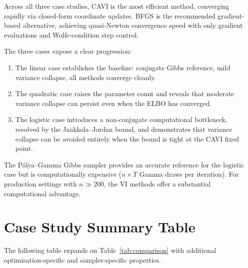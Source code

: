 \documentclass[11pt,a4paper]{article}
\begin{document}
Across all three case studies, CAVI is the most efficient method, converging rapidly
via closed-form coordinate updates.
BFGS is the recommended gradient-based alternative, achieving quasi-Newton convergence
speed with only gradient evaluations and Wolfe-condition step control.

The three cases expose a clear progression:
\begin{enumerate}
  \item The linear case establishes the baseline: conjugate Gibbs reference, mild
    variance collapse, all methods converge cleanly.
  \item The quadratic case raises the parameter count and reveals that moderate variance
    collapse can persist even when the ELBO has converged.
  \item The logistic case introduces a non-conjugate computational bottleneck, resolved
    by the Jaakkola--Jordan bound, and demonstrates that variance collapse can be
    avoided entirely when the bound is tight at the CAVI fixed point.
\end{enumerate}

The P\'{o}lya--Gamma Gibbs sampler provides an accurate reference for the logistic case
but is computationally expensive ($n \times T$ Gamma draws per iteration).
For production settings with $n \gg 200$, the VI methods offer a substantial
computational advantage.

\printbibliography

\appendix

\section{Case Study Summary Table}
\label{app:comparison-table}

The following table expands on Table~\ref{tab:comparison} with additional
optimisation-specific and sampler-specific properties.
\end{document}

